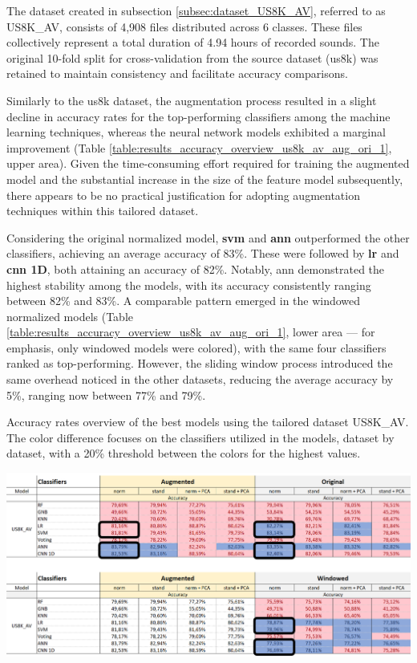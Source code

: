 
The dataset created in subsection \ref{subsec:dataset_US8K_AV}, referred to as US8K\_AV, consists of 4,908 files distributed across 6 classes. These files collectively represent a total duration of 4.94 hours of recorded sounds. The original 10-fold split for cross-validation from the source dataset (\gls{us8k}) was retained to maintain consistency and facilitate accuracy comparisons.

Similarly to the \gls{us8k} dataset, the augmentation process resulted in a slight decline in accuracy rates for the top-performing classifiers among the machine learning techniques, whereas the neural network models exhibited a marginal improvement (Table \ref{table:results_accuracy_overview_us8k_av_aug_ori_1}, upper area). Given the time-consuming effort required for training the augmented model and the substantial increase in the size of the feature model subsequently, there appears to be no practical justification for adopting augmentation techniques within this tailored dataset.

Considering the original normalized model, \textbf{\gls{svm}} and \textbf{\gls{ann}} outperformed the other classifiers, achieving an average accuracy of 83\%. These were followed by \textbf{\gls{lr}} and \textbf{\gls{cnn} 1D}, both attaining an accuracy of 82\%. Notably, \gls{ann} demonstrated the highest stability among the models, with its accuracy consistently ranging between 82\% and 83\%. A comparable pattern emerged in the windowed normalized models (Table \ref{table:results_accuracy_overview_us8k_av_aug_ori_1}, lower area — for emphasis, only windowed models were colored), with the same four classifiers ranked as top-performing. However, the sliding window process introduced the same overhead noticed in the other datasets, reducing the average accuracy by 5\%, ranging now between 77\% and 79\%.

\begin{table}[ht!]
    \caption[Accuracy rates overview using the tailored dataset US8K\_AV.]{Accuracy rates overview of the best models using the tailored dataset US8K\_AV. The color difference focuses on the classifiers utilized in the models, dataset by dataset, with a 20\% threshold between the colors for the highest values.}
    \label{table:results_accuracy_overview_us8k_av_aug_ori_1}
     \raggedright
    \includegraphics[width=1\textwidth]{resources/images/060-results/Results_classification_overview_us8k_av_aug_x_ori_1.png}
\end{table}

